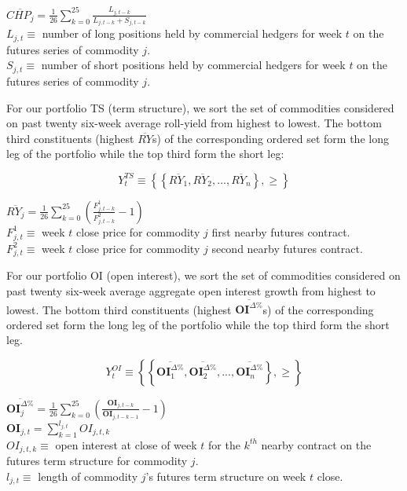 \documentclass[12pt,]{article}
\begin{document}
\(\overline{CHP_{j}}=\frac{1}{26}\sum_{k=0}^{25}\frac{L_{j,t-k}}{L_{j,t-k}+S_{j,t-k}}\)\\
\(L_{j,t}\equiv\) number of long positions held by commercial hedgers
for week \(t\) on the futures series of commodity \(j\).\\
\(S_{j,t}\equiv\) number of short positions held by commercial hedgers
for week \(t\) on the futures series of commodity \(j\).

For our portfolio TS (term structure), we sort the set of commodities
considered on past twenty six-week average roll-yield from highest to
lowest. The bottom third constituents (highest \(\overline{RY}\)s) of
the corresponding ordered set form the long leg of the portfolio while
the top third form the short leg:

\[Y_{t}^{TS}\equiv\left \{ \left \{ \overline{RY_{1}}, \overline{RY_{2}}, ..., \overline{RY_{n}} \right \}, \geq \right \}\]

\(\overline{RY_{j}}=\frac{1}{26}\sum_{k=0}^{25}(\frac{F_{j,t-k}^{1}}{F_{j,t-k}^{2}} - 1)\)\\
\(F_{j,t}^{1}\equiv\) week \(t\) close price for commodity \(j\) first
nearby futures contract.\\
\(F_{j,t}^{2}\equiv\) week \(t\) close price for commodity \(j\) second
nearby futures contract.

For our portfolio OI (open interest), we sort the set of commodities
considered on past twenty six-week average aggregate open interest
growth from highest to lowest. The bottom third constituents (highest
\(\overline{\mathbf{OI}^{\Delta \%}}\)s) of the corresponding ordered
set form the long leg of the portfolio while the top third form the
short leg.

\[Y_{t}^{OI}\equiv\left \{ \left \{ \overline{\mathbf{OI}_{1}^{\Delta \%}}, \overline{\mathbf{OI}_{2}^{\Delta \%}}, ..., \overline{\mathbf{OI}_{n}^{\Delta \%}} \right \}, \geq \right \}\]

\(\overline{\mathbf{OI}_{j}^{\Delta \%}}=\frac{1}{26}\sum_{k=0}^{25}(\frac{\mathbf{OI}_{j,t-k}}{\mathbf{OI}_{j,t-k-1}} - 1)\)\\
\(\mathbf{OI}_{j,t}=\sum_{k=1}^{l_{j,t}}OI_{j,t,k}\)\\
\(OI_{j,t,k}\equiv\) open interest at close of week \(t\) for the
\(k^{th}\) nearby contract on the futures term structure for commodity
\(j\).\\
\(l_{j,t}\equiv\) length of commodity \(j\)'s futures term structure on
week \(t\) close.
\end{document}
